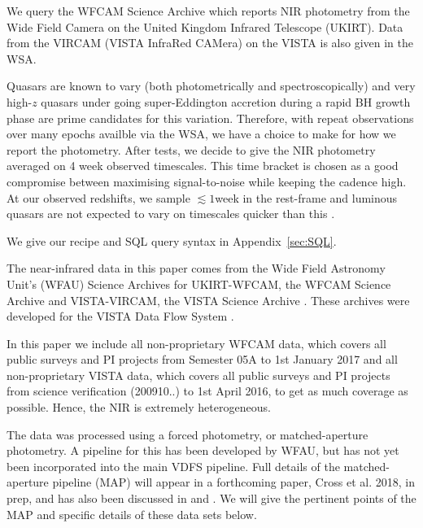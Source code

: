 \documentclass[usenatbib]{mnras}
\begin{document}
We query the WFCAM Science Archive
\citep[\href{http://wsa.roe.ac.uk/}{WSA}; ][]{Hambly2008} which
reports NIR photometry from the Wide Field Camera \citep[WFCAM;
][]{Casali2007} on the United Kingdom Infrared Telescope (UKIRT).
Data from the VIRCAM (VISTA InfraRed CAMera) on the VISTA
\citep[Visible and Infrared Survey Telescope for Astronomy;
][]{Emerson2006, Dalton2006} is also given in the WSA.

Quasars are known to vary (both photometrically and spectroscopically)
and very high-$z$ quasars under going super-Eddington accretion during
a rapid BH growth phase are prime candidates for this variation.
Therefore, with repeat observations over many epochs availble via the
WSA, we have a choice to make for how we report the photometry. After
tests, we decide to give the NIR photometry averaged on 4 week
observed timescales. This time bracket is chosen as a good compromise
between maximising signal-to-noise while keeping the cadence high. At
our observed redshifts, we sample $\lesssim1$week in the rest-frame
and luminous quasars are not expected to vary on timescales quicker
than this \citep[e.g., ][]{Lawrence2016_ASPC}. 
 
We give our recipe and SQL query syntax in Appendix~\ref{sec:SQL}.


The near-infrared data in this paper comes from the Wide Field Astronomy Unit's
(WFAU) Science Archives for UKIRT-WFCAM, the WFCAM Science Archive
\citep[WSA][]{WSA} and VISTA-VIRCAM, the VISTA Science Archive
\citep[VSA][]{VSA}. These archives were developed for the VISTA Data Flow System
\citep[VDFS][]{VDFS}.

In this paper we include all non-proprietary WFCAM data, which covers all
public surveys and PI projects from Semester 05A to 1st January 2017 and all
non-proprietary VISTA data, which covers all public surveys and PI projects from
science verification (200910..) to 1st April 2016, to get as much coverage as
possible. Hence, the NIR is extremely heterogeneous. 

The data was processed using a forced photometry, or matched-aperture
photometry. A pipeline for this has been developed by WFAU, but
has not yet been incorporated into the main VDFS pipeline. Full details of the
matched-aperture pipeline (MAP) will appear in a forthcoming paper, Cross et al.
2018, in prep, and has also been discussed in \citet{Cross2013} and \citet{Cross2017}.
We will give the pertinent points of the MAP and specific details of these data sets below.
\end{document}
